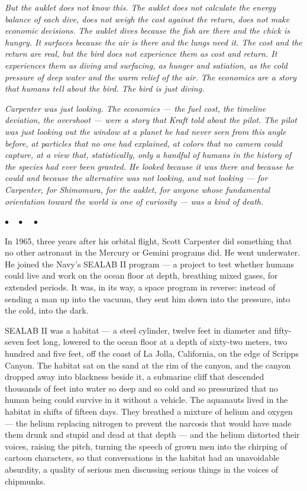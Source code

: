 \documentclass[12pt, letterpaper]{article}
\begin{document}
\emph{But the auklet does not know this. The auklet does not calculate the energy balance of each dive, does not weigh the cost against the return, does not make economic decisions. The auklet dives because the fish are there and the chick is hungry. It surfaces because the air is there and the lungs need it. The cost and the return are real, but the bird does not experience them as cost and return. It experiences them as diving and surfacing, as hunger and satiation, as the cold pressure of deep water and the warm relief of the air. The economics are a story that humans tell about the bird. The bird is just diving.}

\emph{Carpenter was just looking. The economics --- the fuel cost, the timeline deviation, the overshoot --- were a story that Kraft told about the pilot. The pilot was just looking out the window at a planet he had never seen from this angle before, at particles that no one had explained, at colors that no camera could capture, at a view that, statistically, only a handful of humans in the history of the species had ever been granted. He looked because it was there and because he could and because the alternative was not looking, and not looking --- for Carpenter, for Shimomura, for the auklet, for anyone whose fundamental orientation toward the world is one of curiosity --- was a kind of death.}

\begin{center}
$\bullet\quad\bullet\quad\bullet$
\end{center}

In 1965, three years after his orbital flight, Scott Carpenter did something that no other astronaut in the Mercury or Gemini programs did. He went underwater. He joined the Navy's SEALAB II program --- a project to test whether humans could live and work on the ocean floor at depth, breathing mixed gases, for extended periods. It was, in its way, a space program in reverse: instead of sending a man up into the vacuum, they sent him down into the pressure, into the cold, into the dark.

SEALAB II was a habitat --- a steel cylinder, twelve feet in diameter and fifty-seven feet long, lowered to the ocean floor at a depth of sixty-two meters, two hundred and five feet, off the coast of La Jolla, California, on the edge of Scripps Canyon. The habitat sat on the sand at the rim of the canyon, and the canyon dropped away into blackness beside it, a submarine cliff that descended thousands of feet into water so deep and so cold and so pressurized that no human being could survive in it without a vehicle. The aquanauts lived in the habitat in shifts of fifteen days. They breathed a mixture of helium and oxygen --- the helium replacing nitrogen to prevent the narcosis that would have made them drunk and stupid and dead at that depth --- and the helium distorted their voices, raising the pitch, turning the speech of grown men into the chirping of cartoon characters, so that conversations in the habitat had an unavoidable absurdity, a quality of serious men discussing serious things in the voices of chipmunks.
\end{document}
